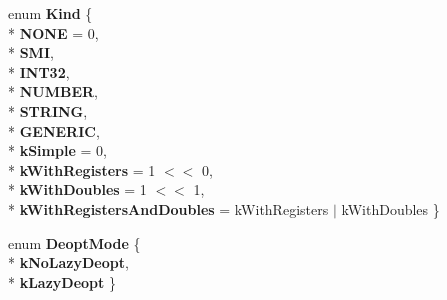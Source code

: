 \begin{DoxyCompactItemize}
\item 
enum {\bfseries Kind} \{ \\*
{\bfseries N\+O\+NE} = 0, 
\\*
{\bfseries S\+MI}, 
\\*
{\bfseries I\+N\+T32}, 
\\*
{\bfseries N\+U\+M\+B\+ER}, 
\\*
{\bfseries S\+T\+R\+I\+NG}, 
\\*
{\bfseries G\+E\+N\+E\+R\+IC}, 
\\*
{\bfseries k\+Simple} = 0, 
\\*
{\bfseries k\+With\+Registers} = 1 $<$$<$ 0, 
\\*
{\bfseries k\+With\+Doubles} = 1 $<$$<$ 1, 
\\*
{\bfseries k\+With\+Registers\+And\+Doubles} = k\+With\+Registers $\vert$ k\+With\+Doubles
 \}\hypertarget{classv8_1_1internal_1_1_b_a_s_e___e_m_b_e_d_d_e_d_a597b8e57ea3ef503b8b2b9e3a70f42fa}{}\label{classv8_1_1internal_1_1_b_a_s_e___e_m_b_e_d_d_e_d_a597b8e57ea3ef503b8b2b9e3a70f42fa}

\item 
enum {\bfseries Deopt\+Mode} \{ \\*
{\bfseries k\+No\+Lazy\+Deopt}, 
\\*
{\bfseries k\+Lazy\+Deopt}
 \}\hypertarget{classv8_1_1internal_1_1_b_a_s_e___e_m_b_e_d_d_e_d_ae197182bf039524422c58a5eedc95670}{}\label{classv8_1_1internal_1_1_b_a_s_e___e_m_b_e_d_d_e_d_ae197182bf039524422c58a5eedc95670}


\end{DoxyCompactItemize}
